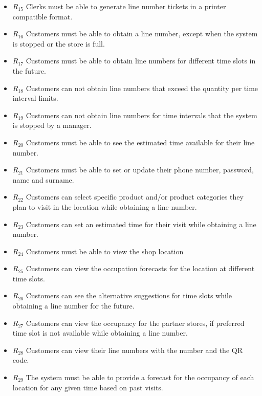 \begin{itemize}
    \item \textbf{$R_{15}$} Clerks must be able to generate line number tickets in a printer compatible format.
    \item \textbf{$R_{16}$} Customers must be able to obtain a line number, except when the system is stopped or the store is full.
    \item \textbf{$R_{17}$} Customers must be able to obtain line numbers for different time slots in the future.
    \item \textbf{$R_{18}$} Customers can not obtain line numbers that exceed the quantity per time interval limits.
    \item \textbf{$R_{19}$} Customers can not obtain line numbers for time intervals that the system is stopped by a manager.
    \item \textbf{$R_{20}$} Customers must be able to see the estimated time available for their line number.
    \item \textbf{$R_{21}$} Customers must be able to set or update their phone number, password, name and surname.
    \item \textbf{$R_{22}$} Customers can select specific product and/or product categories they plan to visit in the location while obtaining a line number.
    \item \textbf{$R_{23}$} Customers can set an estimated time for their visit while obtaining a line number.
    \item \textbf{$R_{24}$} Customers must be able to view the shop location
    \item \textbf{$R_{25}$} Customers can view the occupation forecasts for the location at different time slots.
    \item \textbf{$R_{26}$} Customers can see the alternative suggestions for time slots while obtaining a line number for the future.
    \item \textbf{$R_{27}$} Customers can view the occupancy for the partner stores, if preferred time slot is not available while obtaining a line number.
    \item \textbf{$R_{28}$} Customers can view their line numbers with the number and the QR code.
    \item \textbf{$R_{29}$} The system must be able to provide a forecast for the occupancy of each location for any given time based on past visits.
\end{itemize}

